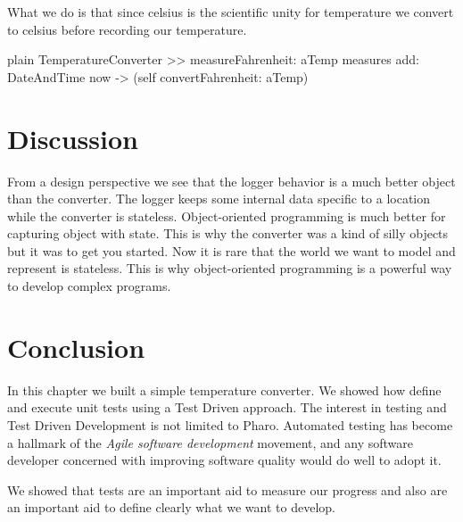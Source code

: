 \documentclass[10pt,twoside,english]{_support/latex/sbabook/sbabook}
\begin{document}
What we do is that since celsius is the scientific unity for temperature we convert to celsius before recording our temperature.

\begin{displaycode}{plain}
TemperatureConverter >> measureFahrenheit: aTemp
    measures add: DateAndTime now -> (self convertFahrenheit: aTemp)
\end{displaycode}
\section{Discussion}
From a design perspective we see that the logger behavior is a much better object than the converter. The logger keeps some internal data specific to a location while the converter is stateless. Object-oriented programming is much better for capturing object with state. This is why the converter was a kind of silly objects but it was to get you started.
Now it is rare that the world we want to model and represent is stateless. This is why object-oriented programming is a powerful way to develop complex programs.
\section{Conclusion}
In this chapter we built a simple temperature converter. We showed how define and execute unit tests using a Test Driven approach. The interest in testing and Test Driven Development is not limited to Pharo. Automated testing has become a hallmark of the \textit{Agile software development} movement, and any software developer concerned with improving
software quality would do well to adopt it.

We showed that tests are an important aid to measure our progress and also are an important aid to define clearly what we want to develop.



\backmatter



\end{document}
